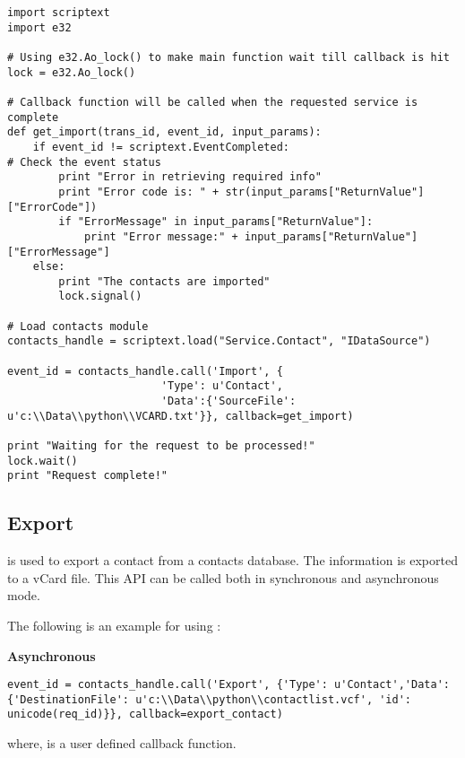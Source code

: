 \begin{verbatim}
import scriptext
import e32

# Using e32.Ao_lock() to make main function wait till callback is hit
lock = e32.Ao_lock()

# Callback function will be called when the requested service is complete
def get_import(trans_id, event_id, input_params):
    if event_id != scriptext.EventCompleted:   
# Check the event status
        print "Error in retrieving required info"
        print "Error code is: " + str(input_params["ReturnValue"]["ErrorCode"])
        if "ErrorMessage" in input_params["ReturnValue"]:
            print "Error message:" + input_params["ReturnValue"]["ErrorMessage"]
    else:
        print "The contacts are imported"
        lock.signal()

# Load contacts module
contacts_handle = scriptext.load("Service.Contact", "IDataSource")

event_id = contacts_handle.call('Import', {
                        'Type': u'Contact',
                        'Data':{'SourceFile': u'c:\\Data\\python\\VCARD.txt'}}, callback=get_import)

print "Waiting for the request to be processed!"
lock.wait()
print "Request complete!"
\end{verbatim}

\subsection{Export}
\label{subsec:contactexport}

 is used to export a contact from a contacts database. The information is exported to a vCard file. This API can be called both in synchronous and asynchronous mode.

The following is an example for using :

{\bf Asynchronous} \break

\begin{verbatim}
event_id = contacts_handle.call('Export', {'Type': u'Contact','Data': {'DestinationFile': u'c:\\Data\\python\\contactlist.vcf', 'id': unicode(req_id)}}, callback=export_contact)
\end{verbatim}

where,  is a user defined callback function.

